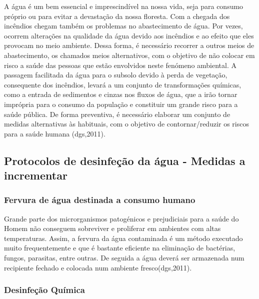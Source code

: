 \documentclass{report}
\begin{document}
A água é um bem essencial e imprescindível na nossa vida, seja para consumo próprio ou para evitar a devastação da nossa floresta. Com a chegada dos incêndios chegam também os problemas no abastecimento de água. 
Por vezes, ocorrem alterações na qualidade da água devido aos incêndios e ao efeito que eles provocam no meio ambiente. Dessa forma, é necessário recorrer a outros meios de abastecimento, os chamados meios alternativos, com o objetivo de não colocar em risco a saúde das pessoas que estão envolvidos neste fenómeno ambiental. A passagem facilitada da água para o subsolo devido à perda de vegetação, consequente dos incêndios, levará a um conjunto de transformações químicas, como a entrada de sedimentos e cinzas nos fluxos de água, que a irão tornar imprópria para o consumo da população e constituir um grande risco para a saúde pública.
De forma preventiva, é necessário elaborar um conjunto de medidas alternativas às habituais, com o objetivo de contornar/reduzir os riscos para a saúde humana  (\ac{dgs},2011).


\subsection{Protocolos de desinfeção da água - Medidas a incrementar}

\subsubsection{Fervura de água destinada a consumo humano}
\cite{dgsriscos}

Grande parte dos microrganismos patogénicos e prejudiciais para a saúde do Homem não conseguem sobreviver e proliferar em ambientes com altas temperaturas. Assim, a fervura da água contaminada é um método executado muito frequentemente e que é bastante eficiente na eliminação de bactérias, fungos, parasitas, entre outras. De seguida a água deverá ser armazenada num recipiente fechado e colocada num ambiente fresco(\ac{dgs},2011).

\subsubsection{Desinfeção Química}
\cite{dgsriscos}
\end{document}
